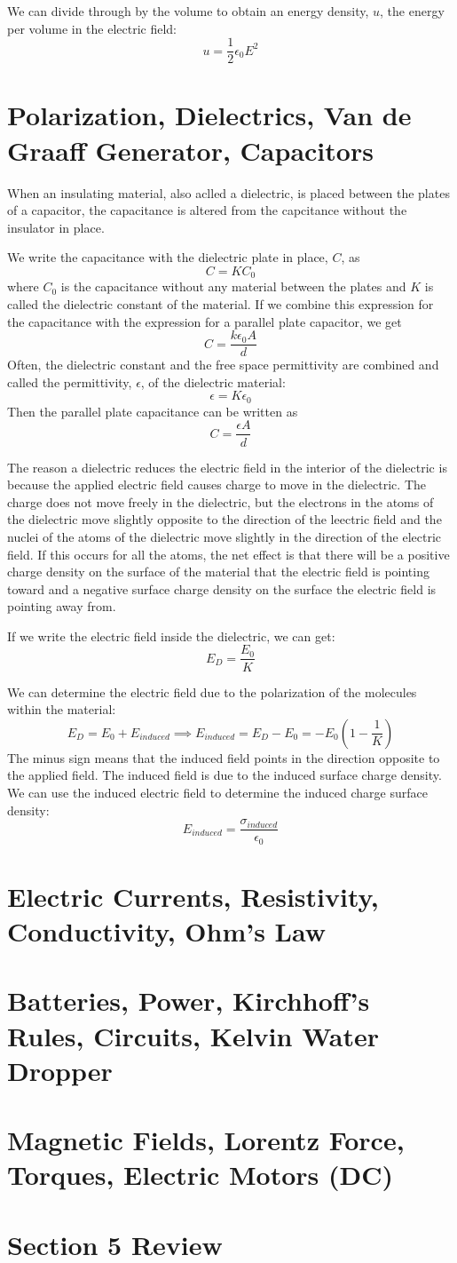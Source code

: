 \documentclass[../introphysics.tex]{subfiles}
\begin{document}
We can divide through by the volume to obtain an energy density, $u$, the energy per volume in the electric field:
\[u=\frac{1}{2}\epsilon_0 E^2\] 

\section{Polarization, Dielectrics, Van de Graaff Generator, Capacitors}
When an insulating material, also aclled a dielectric, is placed between the plates of a capacitor, 
the capacitance is altered from the capcitance without the insulator in place.

We write the capacitance with the dielectric plate in place, $C$, as 
\[C=KC_0\]
where $C_0$ is the capacitance without any material between the plates and $K$ is called the dielectric constant of the 
material. If we combine this expression for the capacitance with the expression for a parallel plate capacitor, we get
\[C=\frac{k\epsilon_0 A}{d}\]
Often, the dielectric constant and the free space permittivity are combined and called the permittivity, $\epsilon$, of the dielectric material:
\[\epsilon = K\epsilon_0\]
Then the parallel plate capacitance can be written as
\[C=\frac{\epsilon A}{d}\]

The reason a dielectric reduces the electric field in the interior of the dielectric 
is because the applied electric field causes charge to move in the dielectric. The charge does 
not move freely in the dielectric, but the electrons in the atoms of the dielectric move slightly opposite to the direction of the leectric field 
and the nuclei of the atoms of the dielectric move slightly in the direction of the electric field.
If this occurs for all the atoms, the net effect is that there will be a positive charge density on the surface 
of the material that the electric field is pointing toward and a negative surface charge density on the surface the electric field is pointing away from.

If we write the electric field inside the dielectric, we can get:
\[E_D=\frac{E_0}{K}\]

We can determine the electric field due to the polarization of the molecules within the material:
\[E_D=E_0+E_{induced}\implies E_{induced}=E_D-E_0=-E_0\left(1-\frac{1}{K}\right)\] 
The minus sign means that the induced field points in the direction opposite to the applied field. 
The induced field is due to the induced surface charge density. We can use the induced electric field to determine the induced charge surface density:
\[E_{induced}=\frac{\sigma_{induced}}{\epsilon_0}\]


\section{Electric Currents, Resistivity, Conductivity, Ohm's Law}
\section{Batteries, Power, Kirchhoff's Rules, Circuits, Kelvin Water Dropper}
\section{Magnetic Fields, Lorentz Force, Torques, Electric Motors (DC)}
\section{Section 5 Review}
\end{document}
